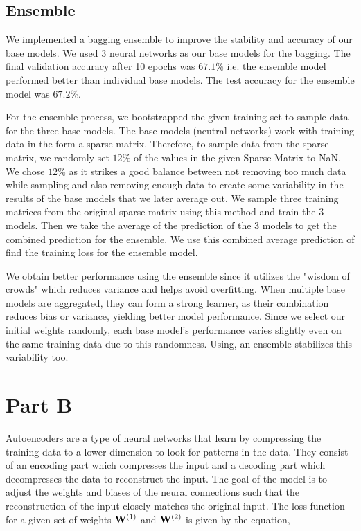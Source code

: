 \documentclass{article}
\begin{document}
\subsection*{Ensemble}
We implemented a bagging ensemble to improve the stability and accuracy of our base models. We used 3 neural networks as our base models for the bagging. The final validation accuracy after 10 epochs was $67.1\%$ i.e. the ensemble model performed better than individual base models. The test accuracy for the ensemble model was $67.2\%$. 

For the ensemble process, we bootstrapped the given training set to sample data for the three base models. The base models (neutral networks) work with training data in the form a sparse matrix. Therefore, to sample data from the sparse matrix, we randomly set $12\%$ of the values in the given Sparse Matrix to NaN. We chose $12\%$ as it strikes a good balance between not removing too much data while sampling and also removing enough data to create some variability in the results of the base models that we later average out. We sample three training matrices from the original sparse matrix using this method and train the 3 models. Then we take the average of the prediction of the 3 models to get the combined prediction for the ensemble. We use this combined average prediction of find the training loss for the ensemble model.

We obtain better performance using the ensemble since it utilizes the "wisdom of crowds" which reduces variance and helps avoid overfitting. When multiple base models are aggregated, they can form a strong learner, as their combination reduces bias or variance, yielding better model performance. Since we select our initial weights randomly, each base model's performance varies slightly even on the same training data due to this randomness. Using, an ensemble stabilizes this variability too. 

\section*{Part B}
Autoencoders are a type of neural networks that learn by compressing the training data to a lower dimension to look for patterns in the data. They consist of an encoding part which compresses the input and a decoding part which decompresses the data to reconstruct the input. The goal of the model is to adjust the weights and biases of the neural connections such that the reconstruction of the input closely matches the original input. The loss function for a given set of weights $\bold{W}^{(1)}$ and $\bold{W}^{(2)}$ is given by the equation,
\end{document}
